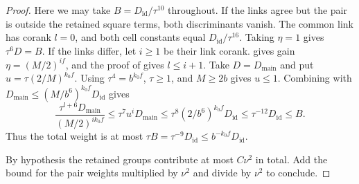 \begin{proof}
Here we may take $B=D_{\mathrm{id}}/\tau^{10}$ throughout.
If the links agree but the pair is outside the retained square terms,
both discriminants vanish. The common link has corank $l=0$,
and both cell constants equal $D_{\mathrm{id}}/\tau^{16}$.
Taking $\eta=1$ gives $\tau^6D=B$.
If the links differ, let $i\ge1$ be their link corank.
 gives gain $\eta=(M/2)^{if}$, and the proof of  gives $l\le i+1$.
Take $D=D_{\mathrm{main}}$ and put $u=\tau(2/M)^{k_0 f}$.
Using $\tau^4=b^{k_0f}$, $\tau\ge1$, and $M\ge 2b$ gives $u\le1$.
Combining with $D_{\mathrm{main}}\le(M/b^6)^{k_0f}D_{\mathrm{id}}$ gives
\[
 \frac{\tau^{l+6}D_{\mathrm{main}}}{(M/2)^{ik_0f}}
 \le \tau^7 u^iD_{\mathrm{main}}
 \le \tau^8(2/b^6)^{k_0f}D_{\mathrm{id}}
 \le \tau^{-12}D_{\mathrm{id}}\le B.
\]
Thus the total weight is at most
$\tau B=\tau^{-9}D_{\mathrm{id}}\le b^{-k_0f}D_{\mathrm{id}}$.

By hypothesis the retained groups contribute at most $C\nu^2$ in total.
Add the bound for the pair weights multiplied by $\nu^2$ and divide by $\nu^2$ to conclude.
\end{proof}


